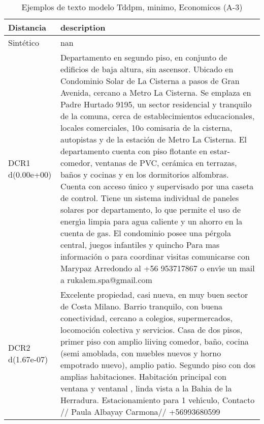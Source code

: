 \begin{table}[H]
\centering
\fontsize{10}{14}\selectfont
\caption{Ejemplos de texto modelo Tddpm, minimo, Economicos (A-3)}
\label{table-example-economicos-a-3-tddpm_mlp-min-text}
\begin{tabular}{|l|m{35em}|}
\hline
\rowcolor[gray]{0.8}
Distancia & description \\
\hline Sintético & nan \\
\hline DCR1 d(0.00e+00) & Departamento en segundo piso, en conjunto de edificios de baja altura, sin ascensor. Ubicado en Condominio Solar de La Cisterna a pasos de Gran Avenida, cercano a Metro La Cisterna. Se emplaza en Padre Hurtado 9195, un sector residencial y tranquilo de la comuna, cerca de establecimientos educacionales, locales comerciales, 10o comisaria de la cisterna, autopistas y de la estaci\'on de Metro La Cisterna. El departamento cuenta con piso flotante en estar-comedor, ventanas de PVC, cer\'amica en terrazas, ba\~nos y cocinas y en los dormitorios alfombras.  Cuenta con acceso \'unico y supervisado por una caseta de control. Tiene un sistema individual de paneles solares por departamento, lo que permite el uso de energ{\'\i}a limpia para agua caliente y un ahorro en la cuenta de gas. El condominio posee una p\'ergola central, juegos infantiles y quincho Para mas informaci\'on o para coordinar visitas comunicarse con Marypaz Arredondo al +56 953717867 o env{\'\i}e un mail a rukalem.spa@gmail.com \\
\hline DCR2 d(1.67e-07) & Excelente propiedad, casi nueva, en muy buen sector de Costa Milano.  Barrio tranquilo, con buena conectividad, cercano a colegios, supermercados, locomoci\'on colectiva y servicios. Casa de dos pisos, primer piso con amplio liiving comedor, ba\~no, cocina (semi amoblada, con muebles nuevos y horno empotrado nuevo), amplio patio. Segundo piso con dos amplias habitaciones. Habitaci\'on principal con ventana y ventanal , linda vista a la Bahia de la Herradura. Estacionamiento para 1 veh{\'\i}culo, Contacto // Paula Albayay Carmona// +56993680599 \\
\hline
\end{tabular}
\end{table}

